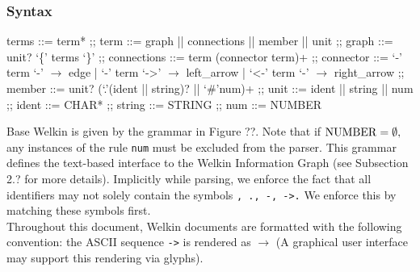 \subsubsection*{Syntax}
\begin{bnfgrammar}
	terms ::= term* ;;
	term ::= graph || connections || member || unit ;;
	graph ::= unit? `\{' terms `\}' ;;
	connections ::= term (connector term)+ ;;
	connector ::= `-' term `-' $\to$ edge
	| `-' term `->' $\to$ left\_arrow
	| `<-' term `-' $\to$ right\_arrow ;;
	member ::= unit? (`.'(ident || string)? || `\#'num)+ ;;
	unit ::= ident || string || num ;;
	ident ::= CHAR* ;;
	string ::= STRING ;;
	num ::= NUMBER
\end{bnfgrammar}
Base Welkin is given by the grammar in Figure ??. Note that if $\mathrm{NUMBER}= \emptyset,$ any instances of the rule \texttt{num} must be excluded from the parser. This grammar defines the text-based interface to the Welkin Information Graph (see Subsection 2.? for more details). Implicitly while parsing, we enforce the fact that all identifiers may not solely contain the symbols \texttt{{}, ., -, ->.} We enforce this by matching these symbols first.
\\ Throughout this document, Welkin documents are formatted with the following convention: the ASCII sequence \texttt{->} is rendered as $\to$ (A graphical user interface may support this rendering via glyphs). %


